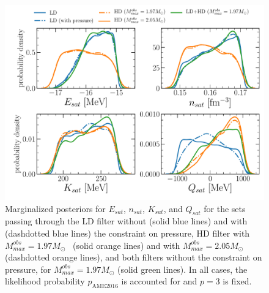 \begin{figure}[!t]
\begin{center}
  \includegraphics[width=1.0\linewidth]{figures/is_dist.pdf}
\end{center}
\caption[Marginalized posteriors for isoscalar empirical parameters assuming
different filters]{Marginalized posteriors for $E_{sat}$, $n_{sat}$, $K_{sat}$, 
and $Q_{sat}$ for the sets passing through the LD filter without (solid blue
lines) and with (dashdotted blue lines) the constraint on pressure, HD
filter with $M_{max}^{obs}=1.97M_\odot$~\cite{Antoniadis2013} (solid orange
lines) and with $M_{max}^{obs}=2.05M_\odot$~\cite{Cromartie2020}
(dashdotted orange lines), and both filters without the constraint on 
pressure, for $M_{max}^{obs}=1.97M_\odot$ (solid green lines). In all cases, 
the likelihood probability $p_{\text{AME2016}}$ is accounted for and $p=3$ is 
fixed.}\label{fig:is_dist}
\end{figure}
 

